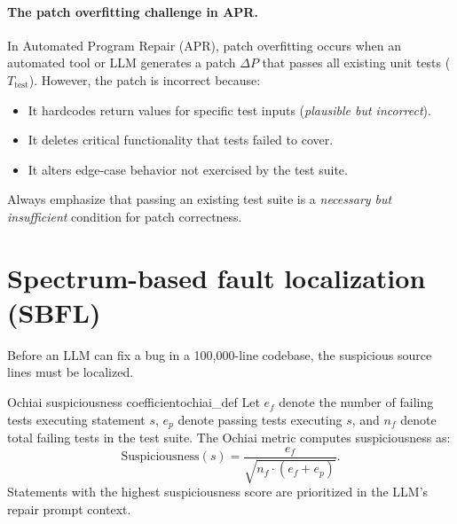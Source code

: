\documentclass[../../main.tex]{subfiles}
\begin{document}
\paragraph{The patch overfitting challenge in APR.}
In Automated Program Repair (APR), patch overfitting occurs when an automated tool or LLM generates a patch $\Delta P$ that passes all existing unit tests ($T_{\text{test}}$). However, the patch is incorrect because:
\begin{itemize}
    \item It hardcodes return values for specific test inputs (\emph{plausible but incorrect}).
    \item It deletes critical functionality that tests failed to cover.
    \item It alters edge-case behavior not exercised by the test suite.
\end{itemize}
Always emphasize that passing an existing test suite is a \emph{necessary but insufficient} condition for patch correctness.


\section{Spectrum-based fault localization (SBFL)}
Before an LLM can fix a bug in a 100,000-line codebase, the suspicious source lines must be localized.

\begin{definition}{Ochiai suspiciousness coefficient}{ochiai_def}
Let $e_f$ denote the number of failing tests executing statement $s$, $e_p$ denote passing tests executing $s$, and $n_f$ denote total failing tests in the test suite. The Ochiai metric computes suspiciousness as:
\begin{equation}
\label{eq:ochiai}
\text{Suspiciousness}(s) = \frac{e_f}{\sqrt{n_f \cdot (e_f + e_p)}}.
\end{equation}
Statements with the highest suspiciousness score are prioritized in the LLM's repair prompt context.
\end{definition}
\end{document}
